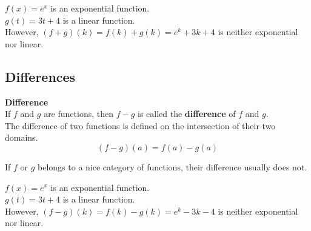 \documentclass{ximera}
\begin{document}
\begin{example}

$f(x) = e^x$ is an exponential function. \\
$g(t) = 3 t + 4$ is a linear function. \\

However, $(f + g)(k) = f(k) + g(k) = e^k + 3 k + 4$ is neither exponential nor linear.

\end{example}








\subsection*{Differences}



\begin{template}  \textbf{\textcolor{blue!55!black}{Difference}} \\


If  $f$ and $g$ are functions, then $f - g$ is called the \textbf{\textcolor{green!50!black}{difference}} of $f$ and $g$. \\

The difference of two functions is defined on the intersection of their two domains. \\


\[ (f - g)(a) = f(a) - g(a)  \]



\end{template}



\begin{warning}

If $f$ or $g$ belongs to a nice category of functions, their difference usually does not.

\end{warning}





\begin{example}

$f(x) = e^x$ is an exponential function. \\
$g(t) = 3 t + 4$ is a linear function. \\

However, $(f - g)(k) = f(k) - g(k) = e^k - 3 k - 4$ is neither exponential nor linear.

\end{example}
\end{document}
